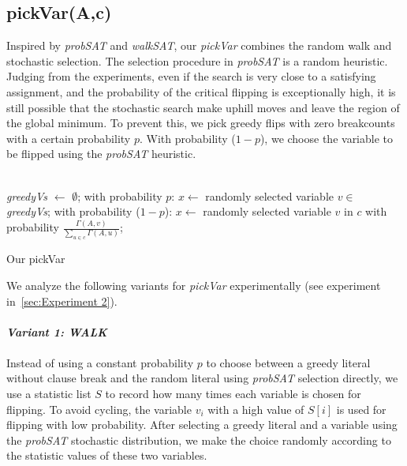 \documentclass[12pt,a4paper,twoside]{scrartcl}
\numberwithin{equation}{section}
\begin{document}
\subsection{pickVar(A,c)}
Inspired by \emph{probSAT} and \emph{walkSAT}, our \emph{pickVar} combines the random walk and stochastic selection. 
The selection procedure in \emph{probSAT} is a random heuristic. Judging from the experiments, even if the search is very close to a satisfying assignment, and the probability of the critical flipping is exceptionally high, it is still possible that the stochastic search make uphill moves and leave the region of the global minimum. To prevent this,  we pick greedy flips with zero breakcounts with a certain probability $p$. With probability ($1-p$), we choose the variable to be flipped using the \emph{probSAT} heuristic.\\
\\
\begin{algorithm}[H]
 \emph{greedyVs} $\leftarrow$ $\emptyset$;\;
  with probability $p$: $x \leftarrow$ randomly selected variable $v \in$ \emph{greedyVs};  \;
  with probability ($1-p$):   $x \leftarrow$ randomly selected  variable $v$ in $c$ with probability $\frac{\Gamma(A,v)}{\sum_{u \in c}\Gamma(A,u)}$;  
\caption{Our pickVar}
\end{algorithm}  
We analyze the following variants for  \emph{pickVar} experimentally (see experiment in~\ref{sec:Experiment 2}).\\
\\ 
 \emph{\textbf{Variant 1: WALK}}\\
\\
Instead of using a constant probability $p$ to choose between a greedy literal without clause break and the random literal using \emph{probSAT} selection directly, we use a statistic list $S$ to record how many times each variable is chosen for flipping. To avoid cycling, the variable $v_i$ with a high value of $S[i]$ is used for flipping with low probability. After selecting a greedy literal and a variable using the \emph{probSAT} stochastic distribution, we make the choice randomly according to the statistic values of these two variables.\\
 \\
\end{document}
